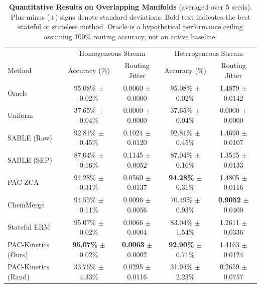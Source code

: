 \begin{table}[t]
\caption{\textbf{Quantitative Results on Overlapping Manifolds} (averaged over 5 seeds). Plus-minus ($\pm$) signs denote standard deviations. Bold text indicates the best stateful or stateless method. Oracle is a hypothetical performance ceiling assuming 100\% routing accuracy, not an active baseline.}
\label{tab:overlapping_results}
\vskip 0.15in
\begin{center}
\begin{small}
\begin{sc}
\begin{tabular}{lcccc}
\toprule
 & \multicolumn{2}{c}{Homogeneous Stream} & \multicolumn{2}{c}{Heterogeneous Stream} \\
Method & Accuracy (\%) & Routing Jitter & Accuracy (\%) & Routing Jitter \\
\midrule
Oracle & 95.08\% $\pm$ 0.02\% & 0.0060 $\pm$ 0.0000 & 95.08\% $\pm$ 0.02\% & 1.4879 $\pm$ 0.0142 \\
Uniform & 37.65\% $\pm$ 0.04\% & 0.0000 $\pm$ 0.0000 & 37.65\% $\pm$ 0.04\% & 0.0000 $\pm$ 0.0000 \\
\midrule
SABLE (Raw) & 92.81\% $\pm$ 0.45\% & 0.1024 $\pm$ 0.0120 & 92.81\% $\pm$ 0.45\% & 1.4690 $\pm$ 0.0107 \\
SABLE (SEP) & 87.04\% $\pm$ 0.16\% & 0.1145 $\pm$ 0.0052 & 87.04\% $\pm$ 0.16\% & 1.3515 $\pm$ 0.0133 \\
PAC-ZCA & 94.28\% $\pm$ 0.31\% & 0.0560 $\pm$ 0.0137 & \textbf{94.28\%} $\pm$ 0.31\% & 1.4805 $\pm$ 0.0116 \\
\midrule
ChemMerge & 94.55\% $\pm$ 0.11\% & 0.0096 $\pm$ 0.0056 & 70.49\% $\pm$ 0.93\% & \textbf{0.9052} $\pm$ 0.0400 \\
Stateful ERM & 95.07\% $\pm$ 0.02\% & 0.0066 $\pm$ 0.0004 & 83.04\% $\pm$ 1.54\% & 1.2611 $\pm$ 0.0336 \\
PAC-Kinetics (Ours) & \textbf{95.07\%} $\pm$ 0.02\% & \textbf{0.0063} $\pm$ 0.0002 & \textbf{92.90\%} $\pm$ 0.71\% & 1.4163 $\pm$ 0.0124 \\
PAC-Kinetics (Rand) & 33.76\% $\pm$ 4.33\% & 0.0295 $\pm$ 0.0116 & 31.94\% $\pm$ 2.23\% & 0.2659 $\pm$ 0.0757 \\
\bottomrule
\end{tabular}
\end{sc}
\end{small}
\end{center}
\vskip -0.1in
\end{table}

